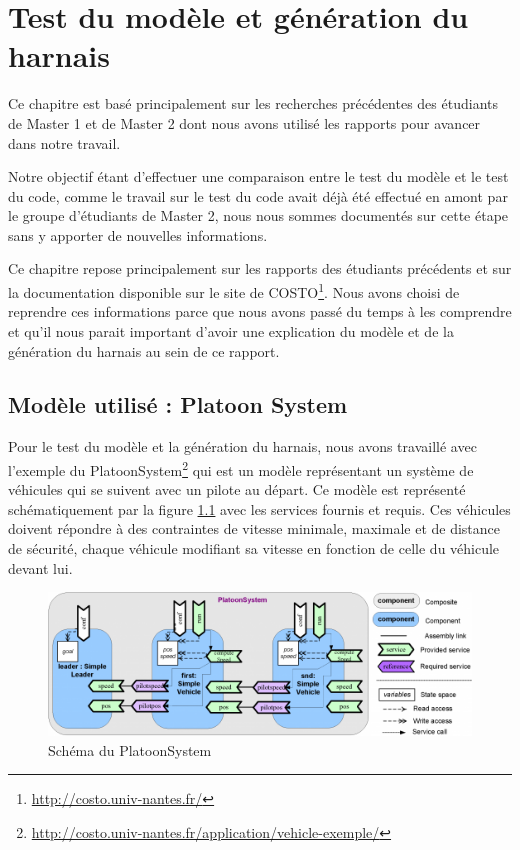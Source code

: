 \chapter{Test du modèle et génération du harnais}
\label{chap:harnais}

Ce chapitre est basé principalement sur les recherches précédentes des étudiants de Master 1 et de Master 2 dont nous avons utilisé les rapports pour avancer dans notre travail.

Notre objectif étant d'effectuer une comparaison entre le test du modèle et le test du code, comme le travail sur le test du code avait déjà été effectué en amont par le groupe d'étudiants de Master 2\cite{rapportM2}, nous nous sommes documentés sur cette étape sans y apporter de nouvelles informations. 

Ce chapitre repose principalement sur les rapports des étudiants précédents et sur la documentation disponible sur le site de COSTO\footnote{\url{http://costo.univ-nantes.fr/}}. Nous avons choisi de reprendre ces informations parce que nous avons passé du temps à les comprendre et qu'il nous parait important d'avoir une explication du modèle et de la génération du harnais au sein de ce rapport.



\section{Modèle utilisé : Platoon System}
\label{sec:harnaisModele}

Pour le test du modèle et la génération du harnais, nous avons travaillé avec l'exemple du PlatoonSystem\footnote{\url{http://costo.univ-nantes.fr/application/vehicle-exemple/}} qui est un modèle représentant un système de véhicules qui se suivent avec un pilote au départ. Ce modèle est représenté schématiquement par la figure \ref{fig:platoonSchema} avec les services fournis et requis. Ces véhicules doivent répondre à des contraintes de vitesse minimale, maximale et de distance de sécurité, chaque véhicule modifiant sa vitesse en fonction de celle du véhicule devant lui.

\begin{figure}[H]
    \includegraphics[scale=0.35]{images/platoonSchema.png}
    \caption{Schéma du PlatoonSystem}
    \label{fig:platoonSchema}
\end{figure}


